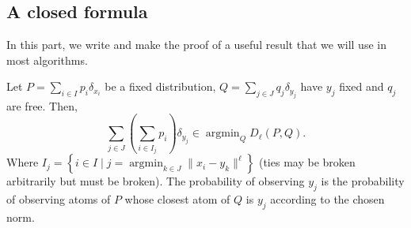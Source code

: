 \documentclass{amsart}
\newcommand{\argmin}{\mathop{\arg\min}}
\begin{document}
\subsection{A closed formula}
In this part, we write and make the proof of a useful result that we will use in most algorithms.
\begin{theorem}\label{closed formula}
    Let $P=\sum_{i\in I}p_i\delta_{x_i}$ be a fixed distribution, $Q=\sum_{j\in J}q_j\delta_{y_j}$ have $y_j$ fixed and $q_j$ are free. Then, 
    $$\sum_{j\in J}\left(\sum_{i\in I_j}p_i\right)\delta_{y_j}\in \argmin_Q D_\ell\left(P,Q\right).$$
    Where $I_j=\left\{i\in I \mid j=\argmin_{k\in J} \lVert x_i-y_k\rVert^\ell\right\}$ (ties may be broken arbitrarily but must be broken). The probability of observing $y_j$ is the probability of observing atoms of $P$ whose closest atom of $Q$ is $y_j$ according to the chosen norm.
\end{theorem}
\end{document}
